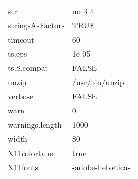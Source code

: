 \documentclass[a4paper]{article}
\begin{document}
\begin{tabular} {ll}
str & no 3 4 \\
stringsAsFactors & TRUE \\
timeout & 60 \\
ts.eps & 1e-05 \\
ts.S.compat & FALSE \\
unzip & /usr/bin/unzip \\
verbose & FALSE \\
warn & 0 \\
warnings.length & 1000 \\
width & 80 \\
X11colortype & true \\
X11fonts & -adobe-helvetica-%

\hline
\end{tabular}
\end{document}
